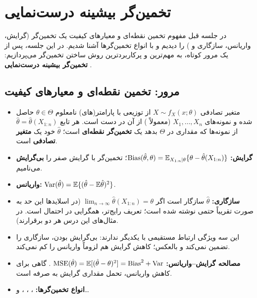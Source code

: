 \chapter{تخمین‌گر بیشینه درست‌نمایی }

در جلسه قبل مفهوم تخمین نقطه‌ای و معیارهای کیفیت یک تخمین‌گر (گرایش، واریانس، سازگاری و ) را دیدیم و با انواع تخمین‌گرها آشنا شدیم. در این جلسه، پس از یک مرور کوتاه، به مهم‌ترین و پرکاربردترین روش ساختن تخمین‌گر می‌پردازیم: \textbf{تخمین‌گر بیشینه درست‌نمایی} .

\section{مرور: تخمین نقطه‌ای و معیارهای کیفیت}

\begin{summarybox}
\begin{itemize}
\item متغیر تصادفی $X\sim f_X(x;\theta)$ از توزیعی با پارامتر(های) نامعلوم $\theta\in\Theta$ حاصل شده و نمونه‌های $X_1,\ldots,X_n$ (معمولاً ) از آن در دست است. هر تابع $\hat\theta=\hat\theta(X_{1:n})$ از نمونه‌ها که مقداری در $\Theta$ بدهد یک \textbf{تخمین‌گر نقطه‌ای} است؛ $\hat\theta$ خود یک \textbf{متغیر تصادفی} است.
\item \textbf{گرایش:} $\mathrm{Bias}(\hat\theta,\theta)=\mathbb{E}_{X_{1:n}|\theta}\{\theta-\hat\theta(X_{1:n})\}$؛ تخمین‌گر با گرایش صفر را \textbf{بی‌گرایش}  می‌نامیم.
\item \textbf{واریانس:} $\operatorname{Var}(\hat\theta)=\mathbb{E}\{(\hat\theta-\mathbb{E}\hat\theta)^2\}$.
\item \textbf{سازگاری:} $\hat\theta$ سازگار است اگر $\lim_{n\to\infty}\hat\theta(X_{1:n})=\theta$ (در اسلایدها این حد به صورت تقریباً حتمی  نوشته شده است؛ تعریف رایج‌تر، همگرایی در احتمال است. در مثال‌های این درس هر دو برقرارند).
\item این سه ویژگی ارتباط مستقیمی با یکدیگر ندارند: بی‌گرایش بودن، سازگاری را تضمین نمی‌کند و بالعکس؛ کاهش گرایش هم لزوماً واریانس را کم نمی‌کند.
\item \textbf{مصالحه گرایش--واریانس:} $\ \mathrm{MSE}(\hat\theta)=\E[(\hat\theta-\theta)^2]=\mathrm{Bias}^2+\Var$. گاهی برای کاهش واریانس، تحمل مقداری گرایش به صرفه است.
\item \textbf{انواع تخمین‌گرها:} ، ، ،  و\ldots
\end{itemize}
\end{summarybox}

